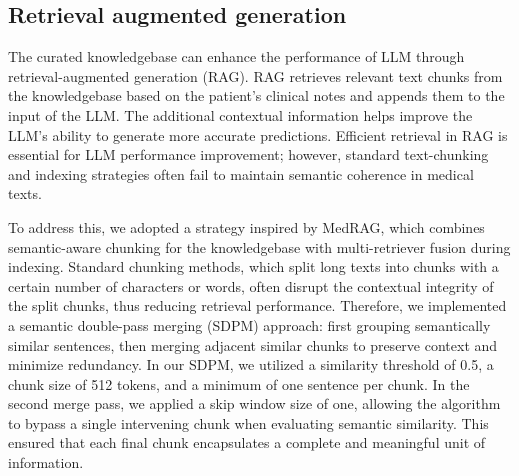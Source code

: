 \documentclass[fleqn,10pt]{wlscirep}
\begin{document}
\subsection*{Retrieval augmented generation}

The curated knowledgebase can enhance the performance of LLM through retrieval-augmented generation (RAG). RAG retrieves relevant text chunks from the knowledgebase based on the patient’s clinical notes and appends them to the input of the LLM. The additional contextual information helps improve the LLM’s ability to generate more accurate predictions. Efficient retrieval in RAG is essential for LLM performance improvement; however, standard text-chunking and indexing strategies often fail to maintain semantic coherence in medical texts. 

To address this, we adopted a strategy inspired by MedRAG,\cite{xiong2024benchmarking} which combines semantic-aware chunking for the knowledgebase with multi-retriever fusion during indexing. Standard chunking methods, which split long texts into chunks with a certain number of characters or words, often disrupt the contextual integrity of the split chunks, thus reducing retrieval performance. Therefore, we implemented a semantic double-pass merging (SDPM) approach: first grouping semantically similar sentences, then merging adjacent similar chunks to preserve context and minimize redundancy. In our SDPM, we utilized a similarity threshold of 0.5, a chunk size of 512 tokens, and a minimum of one sentence per chunk. In the second merge pass, we applied a skip window size of one, allowing the algorithm to bypass a single intervening chunk when evaluating semantic similarity. This ensured that each final chunk encapsulates a complete and meaningful unit of information. 
\end{document}
